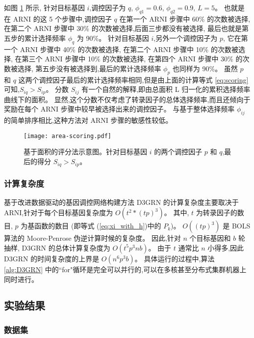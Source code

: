 如图 \ref{area-scoring} 所示, 
针对目标基因 $i$,调控因子为 $q$,  $\phi_{q1}=0.6$, $\phi_{q2}=0.9$, $L=5$。
也就是在 ARNI 的这 5 个步骤中,调控因子 $q$ 在第一个 ARNI 步骤中 60\% 的次数被选择,
在第二个 ARNI 步骤中 30\% 的次数被选择,后面三步都没有被选择,
最后也就是第五步的累计选择频率 $\phi_{q}$ 为 90\%。
针对目标基因 $i$,另外一个调控因子为 $p$,
它在第一个 ARNI 步骤中 40\% 的次数被选择,
在第二个 ARNI 步骤中 10\% 的次数被选择,
在第三个 ARNI 步骤中 10\% 的次数被选择,
在第四个 ARNI 步骤中 30\% 的次数被选择,
第五步没有被选择到,最后的累计选择频率 $\phi_{p}$ 也同样为 90\%。
虽然 $p$ 和 $q$ 这两个调控因子最后的累计选择频率相同,但是由上面的计算等式 \ref{eq:scoring} 可知,$S_{iq} > S_{ip}$。
分数 $S_{ij}$ 有一个自然的解释,即由总面积 L 归一化的累积选择频率曲线下的面积。
显然,这个分数不仅考虑了转录因子的总体选择频率,而且还倾向于奖励在每个 ARNI 步骤中较早被选择出来的调控因子。
与基于整体选择频率 $\phi_{ij}$ 的简单排序相比,这种方法对 ARNI 步骤的敏感性较低。
\begin{figure}[!htbp]
  \centering
  \texttt{[image: area-scoring.pdf]}
  \caption{基于面积的评分法示意图。针对目标基因 $i$ 的两个调控因子 $p$ 和 $q$,最后的得分 $S_{iq} > S_{ip}$。}
  \label{area-scoring}
\end{figure}


\subsubsection{计算复杂度}

基于改进数据驱动的基因调控网络构建方法 D3GRN 的计算复杂度主要取决于 ARNI,针对于每个目标基因复杂度为 $O(t^2*(tp)^3)$。
其中, $t$ 为转录因子的数目, $p$ 为基函数的数目 (即等式 (\ref{eq:xi_with_h})中的 $P_k$)。
$O((tp)^3)$ 是 BOLS 算法的 Moore-Penrose 伪逆计算时候的复杂度。
因此,针对 $n$ 个目标基因和 $b$ 轮抽样, D3GRN 的总体计算复杂度为 $O(t^5p^3nb)$。
由于 $t$ 通常比 $n$ 小得多,因此 D3GRN 的时间复杂度的上界是 $O(n^6p^3b)$。
具体运行的过程中,算法 \ref{alg:D3GRN} 中的``for"循环是完全可以并行的,可以在多核甚至分布式集群机器上同时进行。

\subsection{实验结果}

\subsubsection{数据集}

